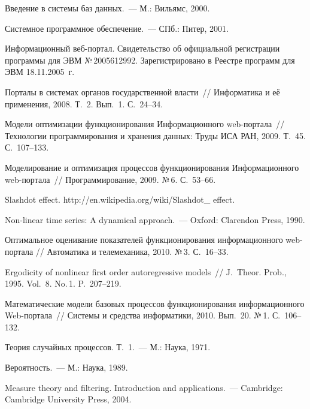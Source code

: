 \begin{multicols}{2}
{{\begin{thebibliography}{99}
Введение в сис\-те\-мы баз данных.~--- М.: Вильямс, 2000.

Системное программное обеспечение.~--- СПб.: Питер, 2001.

Информационный веб-пор\-тал. Свидетельство об официальной регистрации программы для 
ЭВМ №\,2005612992. Зарегистрировано в Реестре программ для ЭВМ 18.11.2005~г.

Порталы в сис\-те\-мах органов государственной власти~// Информатика и её применения, 2008. 
Т.~2. Вып.~1. С.~24--34.

Модели оптимизации функционирования Информационного web-пор\-та\-ла~// Технологии 
программирования и хранения данных: Труды ИСА РАН, 2009. Т.~45. С.~107--133.

Моделирование и оптимизация процессов функционирования Информационного 
web-пор\-та\-ла~// Программирование, 2009. №\,6. С.~53--66.

Slashdot effect. {\sf http://en.wikipedia.org/wiki/Slashdot\_ effect}.

Non-linear time series: A dynamical approach.~--- Oxford: Clarendon Press, 1990.

Оптимальное оценивание показателей функционирования информационного web-портала // 
Автоматика и телемеханика, 2010. №\,3. С.~16--33.

Ergodicity of nonlinear first order autoregressive models~// J.~Theor. Prob., 1995. 
Vol.~8. No.\,1. P.~207--219.

Математические модели базовых процессов функционирования информационного 
Web-пор\-та\-ла~// Системы и средства информатики, 2010. Вып.~20. №\,1. С.~106--132.

Теория случайных процессов. Т.~1.~--- М.: Наука, 1971.

Вероятность.~--- М.: Наука, 1989.

\label{end\stat}

Measure theory and filtering. Introduction and applications.~--- Cambridge: Cambridge University 
Press, 2004.
 \end{thebibliography}
}
}


\end{multicols}       
  